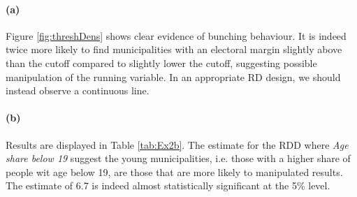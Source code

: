 \documentclass{scrartcl}
\begin{document}
\paragraph*{(a)}
Figure \ref{fig:threshDens} shows clear evidence of bunching behaviour. It is indeed twice more likely to find municipalities with an electoral margin slightly above than the cutoff compared to slightly lower the cutoff, suggesting possible manipulation of the running variable. In an appropriate RD design, we should instead observe a continuous line. 

\paragraph*{(b)}
Results are displayed in Table \ref{tab:Ex2b}. The estimate for the RDD where \textit{Age share below 19} suggest the young municipalities, i.e. those with a higher share of people wit age below 19, are those that are more likely to manipulated results. The estimate of 6.7 is indeed almost statistically significant at the 5\% level.   
\end{document}
